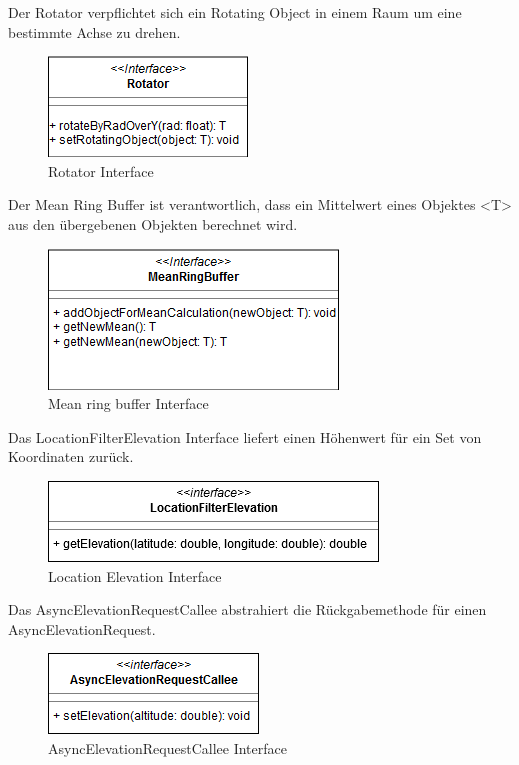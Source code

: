 \documentclass[a4paper]{scrreprt}
\begin{document}
Der Rotator verpflichtet sich ein Rotating Object in einem Raum um eine bestimmte Achse zu drehen.
\begin{figure}[h!]
	\center
	\includegraphics[scale=0.6]{Rotator.png}
	\caption{Rotator Interface}
\end{figure}


Der Mean Ring Buffer ist verantwortlich, dass ein Mittelwert eines Objektes <T> aus den übergebenen Objekten berechnet wird.
\begin{figure}
	\center
	\includegraphics[scale=0.6]{MeanRingBuffer.png}
	\caption{Mean ring buffer Interface}
\end{figure}

Das LocationFilterElevation Interface liefert einen Höhenwert für ein Set von Koordinaten zurück.
\begin{figure}
	\center
	\includegraphics[scale=0.6]{LocationFilterElevation.png}
	\caption{Location Elevation Interface}
\end{figure}

Das AsyncElevationRequestCallee abstrahiert die Rückgabemethode für einen AsyncElevationRequest.
\begin{figure}
	\center
	\includegraphics[scale=0.6]{AsyncElevationRequestCallee.png}
	\caption{AsyncElevationRequestCallee Interface}
\end{figure}
\end{document}
